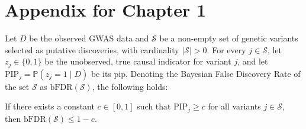 \chapter{Appendix for Chapter 1}
\label{Background_Appendix}

\begin{lemma}
Let $D$ be the observed GWAS data and $\mathcal{S}$ be a non-empty set of genetic variants selected as putative discoveries, with cardinality $|\mathcal{S}| > 0$. For every $j\in \mathcal{S}$, let $z_j \in \{0, 1\}$ be the unobserved, true causal indicator for variant $j$, and let $\text{PIP}_j = \mathbb{P}(z_j = 1 \mid D)$ be its \gls{pip}. Denoting the Bayesian False Discovery Rate of the set $\mathcal{S}$ as $\text{bFDR}(\mathcal{S})$, the following holds:

If there exists a constant $c \in [0, 1]$ such that $\text{PIP}_j \ge c$ for all variants $j \in \mathcal{S}$, then $\text{bFDR}(\mathcal{S}) \le 1 - c$.
\end{lemma}

